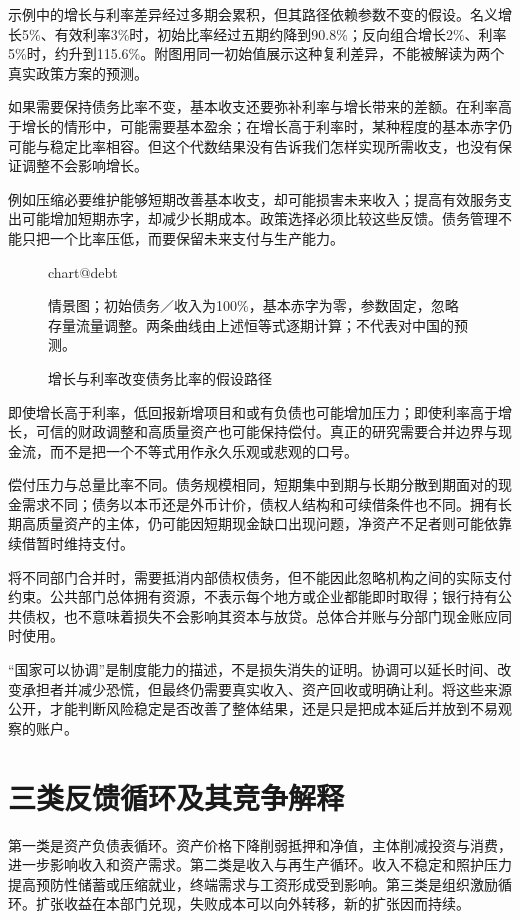 \documentclass[UTF8,fontset=fandol,zihao=-4,oneside,openany]{ctexbook}
\makeatletter
\newcommand{\Chart}[3]{\begin{figure}[htbp]\centering\csname chart@#1\endcsname\caption{#2}\par\small #3\end{figure}}
\makeatother
\begin{document}
\label{arg:P233}
示例中的增长与利率差异经过多期会累积，但其路径依赖参数不变的假设。名义增长5\%、有效利率3\%时，初始比率经过五期约降到90.8\%；反向组合增长2\%、利率5\%时，约升到115.6\%。附图用同一初始值展示这种复利差异，不能被解读为两个真实政策方案的预测。

如果需要保持债务比率不变，基本收支还要弥补利率与增长带来的差额。在利率高于增长的情形中，可能需要基本盈余；在增长高于利率时，某种程度的基本赤字仍可能与稳定比率相容。但这个代数结果没有告诉我们怎样实现所需收支，也没有保证调整不会影响增长。

例如压缩必要维护能够短期改善基本收支，却可能损害未来收入；提高有效服务支出可能增加短期赤字，却减少长期成本。政策选择必须比较这些反馈。债务管理不能只把一个比率压低，而要保留未来支付与生产能力。

\Chart{debt}{增长与利率改变债务比率的假设路径}{情景图；初始债务／收入为100\%，基本赤字为零，参数固定，忽略存量流量调整。两条曲线由上述恒等式逐期计算；不代表对中国的预测。}

即使增长高于利率，低回报新增项目和或有负债也可能增加压力；即使利率高于增长，可信的财政调整和高质量资产也可能保持偿付。真正的研究需要合并边界与现金流，而不是把一个不等式用作永久乐观或悲观的口号。

\label{arg:P234}
偿付压力与总量比率不同。债务规模相同，短期集中到期与长期分散到期面对的现金需求不同；债务以本币还是外币计价，债权人结构和可续借条件也不同。拥有长期高质量资产的主体，仍可能因短期现金缺口出现问题，净资产不足者则可能依靠续借暂时维持支付。

将不同部门合并时，需要抵消内部债权债务，但不能因此忽略机构之间的实际支付约束。公共部门总体拥有资源，不表示每个地方或企业都能即时取得；银行持有公共债权，也不意味着损失不会影响其资本与放贷。总体合并账与分部门现金账应同时使用。

“国家可以协调”是制度能力的描述，不是损失消失的证明。协调可以延长时间、改变承担者并减少恐慌，但最终仍需要真实收入、资产回收或明确让利。将这些来源公开，才能判断风险稳定是否改善了整体结果，还是只是把成本延后并放到不易观察的账户。

\section{三类反馈循环及其竞争解释}
第一类是资产负债表循环。资产价格下降削弱抵押和净值，主体削减投资与消费，进一步影响收入和资产需求。第二类是收入与再生产循环。收入不稳定和照护压力提高预防性储蓄或压缩就业，终端需求与工资形成受到影响。第三类是组织激励循环。扩张收益在本部门兑现，失败成本可以向外转移，新的扩张因而持续。
\end{document}
